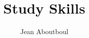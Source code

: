 \documentclass[a4paper, twoside]{report}
\title{Study Skills}
\author{Jean Aboutboul}
\begin{document}

\newpage
\renewcommand{\headrulewidth}{0pt}
\strut
\newpage
\tableofcontents










%

%
%
\end{document}
